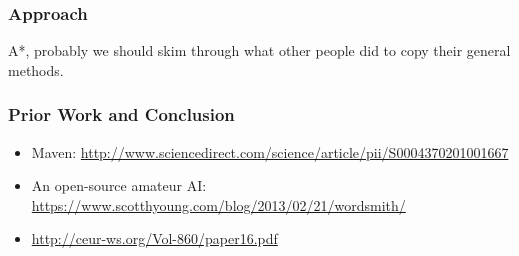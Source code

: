 \documentclass[12pt]{article}
\begin{document}

\subsubsection*{Approach}
A*, probably we should skim through what other people did to copy their general methods.

\subsubsection*{Prior Work and Conclusion}
\begin{footnotesize}
\begin{itemize}
\item Maven: \url{http://www.sciencedirect.com/science/article/pii/S0004370201001667}
\item An open-source amateur AI: \url{https://www.scotthyoung.com/blog/2013/02/21/wordsmith/}
\item \url{http://ceur-ws.org/Vol-860/paper16.pdf}
\end{itemize}
\end{footnotesize}
\end{document}
